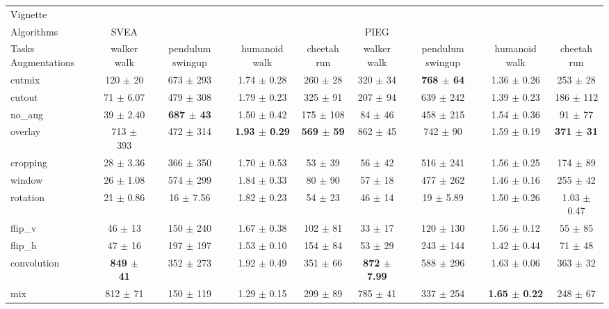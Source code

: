 \begin{tabular}{lcccccccc}
Vignette & & & & & & & & \\
Algorithms & SVEA & & & & PIEG & & & \\
Tasks Augmentations & walker walk & pendulum swingup & humanoid walk & cheetah run & walker walk & pendulum swingup & humanoid walk & cheetah run \\
cutmix          & 120 $\pm$ 20 & 673 $\pm$ 293 & 1.74 $\pm$ 0.28 & 260 $\pm$ 28 & 320 $\pm$ 34 & \textbf{768 $\pm$ 64} & 1.36 $\pm$ 0.26 & 253 $\pm$ 28 \\
cutout          & 71 $\pm$ 6.07 & 479 $\pm$ 308 & 1.79 $\pm$ 0.23 & 325 $\pm$ 91 & 207 $\pm$ 94 & 639 $\pm$ 242 & 1.39 $\pm$ 0.23 & 186 $\pm$ 112 \\
no\_aug         & 39 $\pm$ 2.40 & \textbf{687 $\pm$ 43} & 1.50 $\pm$ 0.42 & 175 $\pm$ 108 & 84 $\pm$ 46 & 458 $\pm$ 215 & 1.54 $\pm$ 0.36 & 91 $\pm$ 77 \\
overlay         & 713 $\pm$ 393 & 472 $\pm$ 314 & \textbf{1.93 $\pm$ 0.29} & \textbf{569 $\pm$ 59} & 862 $\pm$ 45 & 742 $\pm$ 90 & 1.59 $\pm$ 0.19 & \textbf{371 $\pm$ 31} \\
cropping        & 28 $\pm$ 3.36 & 366 $\pm$ 350 & 1.70 $\pm$ 0.53 & 53 $\pm$ 39 & 56 $\pm$ 42 & 516 $\pm$ 241 & 1.56 $\pm$ 0.25 & 174 $\pm$ 89 \\
window          & 26 $\pm$ 1.08 & 574 $\pm$ 299 & 1.84 $\pm$ 0.33 & 80 $\pm$ 90 & 57 $\pm$ 18 & 477 $\pm$ 262 & 1.46 $\pm$ 0.16 & 255 $\pm$ 42 \\
rotation        & 21 $\pm$ 0.86 & 16 $\pm$ 7.56 & 1.82 $\pm$ 0.23 & 54 $\pm$ 23 & 46 $\pm$ 14 & 19 $\pm$ 5.89 & 1.50 $\pm$ 0.26 & 1.03 $\pm$ 0.47 \\
flip\_v         & 46 $\pm$ 13 & 150 $\pm$ 240 & 1.67 $\pm$ 0.38 & 102 $\pm$ 81 & 33 $\pm$ 17 & 120 $\pm$ 130 & 1.56 $\pm$ 0.12 & 55 $\pm$ 85 \\
flip\_h         & 47 $\pm$ 16 & 197 $\pm$ 197 & 1.53 $\pm$ 0.10 & 154 $\pm$ 84 & 53 $\pm$ 29 & 243 $\pm$ 144 & 1.42 $\pm$ 0.44 & 71 $\pm$ 48 \\
convolution     & \textbf{849 $\pm$ 41} & 352 $\pm$ 273 & 1.92 $\pm$ 0.49 & 351 $\pm$ 66 & \textbf{872 $\pm$ 7.99} & 588 $\pm$ 296 & 1.63 $\pm$ 0.06 & 363 $\pm$ 32 \\
mix             & 812 $\pm$ 71 & 150 $\pm$ 119 & 1.29 $\pm$ 0.15 & 299 $\pm$ 89 & 785 $\pm$ 41 & 337 $\pm$ 254 & \textbf{1.65 $\pm$ 0.22} & 248 $\pm$ 67 \\
\end{tabular}